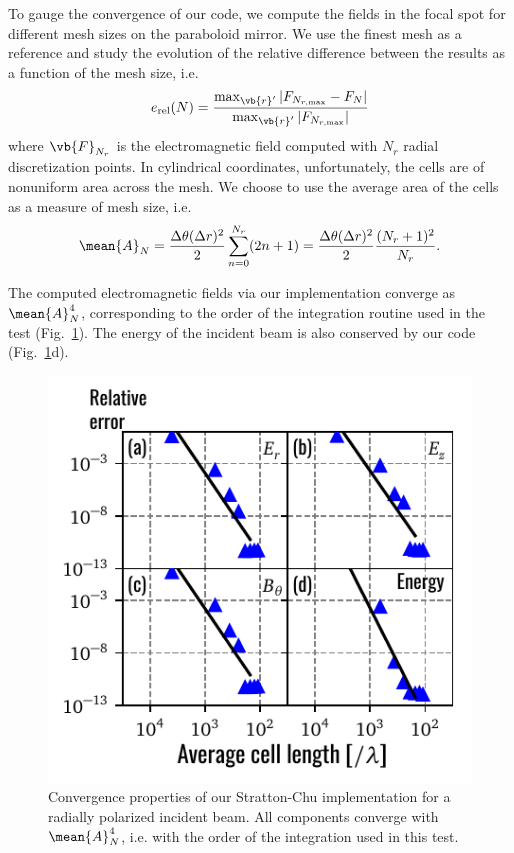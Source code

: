 \documentclass[11pt,SymmetricalJury]{inrsthesis/inrsthesis}
\begin{document}
To gauge the convergence of our code, we compute the fields in the focal spot
for different mesh sizes on the paraboloid mirror. We use the finest mesh as a
reference and study the evolution of the relative difference between the results
as a function of the mesh size, i.e.
  \begin{equation}
    e_\text{rel}(N) = \frac{\max_{\vb{r}'}|F_{N_{r,\text{max}}}-F_{N}|}
                            {\max_{\vb{r}'}|F_{N_{r,\text{max}}}|}
  \end{equation}
where $\vb{F}_{N_r}$ is the electromagnetic field computed with $N_r$ radial
discretization points. In cylindrical coordinates, unfortunately, the cells are
of nonuniform area across the mesh. We choose to use the average area of the
cells as a measure of mesh size, i.e.
  \begin{equation}
    \mean{A}_N = \frac{\Delta\theta(\Delta r)^2}{2}\sum_{n=0}^{N_r} (2n+1)
               = \frac{\Delta\theta(\Delta r)^2}{2}\frac{(N_r+1)^2}{N_r}.
  \end{equation}

The computed electromagnetic fields via our implementation converge as
$\mean{A}_N^4$, corresponding to the order of the integration routine used in
the test (Fig.~\ref{fig:sc.convergence-radial}). The energy of the incident beam
is also conserved by our code (Fig.~\ref{fig:sc.convergence-radial}d).

\begin{figure}
  \centering
  \includegraphics{figs/ConvergenceAll.pdf}
  \caption[Convergence pro
  perties of our Stratton-Chu implementation (radial polarization).]
  {Convergence properties of our Stratton-Chu implementation for a radially polarized
  incident beam. All components converge with $\mean{A}_N^4$,
  i.e. with the order of the integration used in this test.}
  \label{fig:sc.convergence-radial}
\end{figure}
\end{document}
